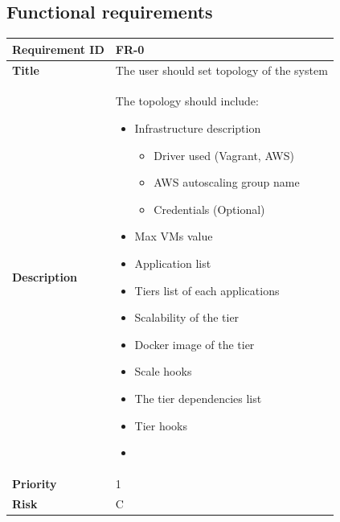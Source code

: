 \subsection{Functional requirements}

\begin{table}[ht]
  \begin{tabular}{|p{3.5cm}|p{8cm}|}
  \hline
    \textbf{Requirement ID}  & FR-0 \\
  \hline
    \textbf{Title}  & \begin{sloppypar}The user should set topology of the system\end{sloppypar}\\
  \hline
    \textbf{Description}  & \begin{sloppypar}The topology should include:
      \begin{itemize}
        \item Infrastructure description
            \begin{itemize}
                \item Driver used (Vagrant, AWS)
                \item AWS autoscaling group name
                \item Credentials (Optional)
            \end{itemize}

        \item Max VMs value
        \item Application list
        \item Tiers list of each applications
        \item Scalability of the tier
        \item Docker image of the tier
        \item Scale hooks
        \item The tier dependencies list
        \item Tier hooks
        \item 
      \end{itemize}
    \end{sloppypar}\\
  \hline
    \textbf{Priority}  & 1\\
  \hline
    \textbf{Risk}  & C \\
  \hline
  \end{tabular}
\end{table}

